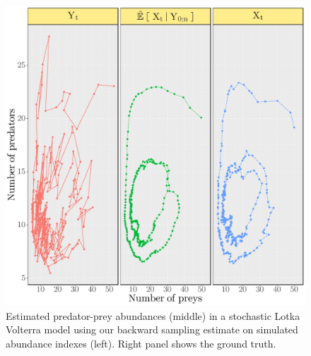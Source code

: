 \documentclass[12pt]{article}
\begin{document}
\begin{figure}
\begin{center}
\includegraphics[scale = .4]{Figure8.pdf}
\end{center}
\caption{\label{fig:LV:tracking} Estimated predator-prey abundances (middle) in a stochastic Lotka Volterra model using our backward sampling estimate on simulated abundance indexes (left). Right panel shows the ground truth.}
\end{figure}
\end{document}
